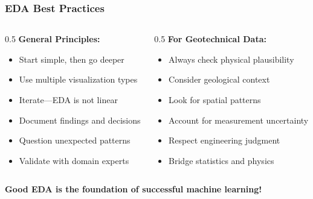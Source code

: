 \documentclass[aspectratio=169]{beamer}
\begin{document}
\begin{frame}
\frametitle{EDA Best Practices}

\begin{columns}[T]
    \begin{column}{0.5\textwidth}
        \textbf{General Principles:}
        \begin{itemize}
            \item Start simple, then go deeper
            \item Use multiple visualization types
            \item Iterate—EDA is not linear
            \item Document findings and decisions
            \item Question unexpected patterns
            \item Validate with domain experts
        \end{itemize}
    \end{column}
    \begin{column}{0.5\textwidth}
        \textbf{For Geotechnical Data:}
        \begin{itemize}
            \item Always check physical plausibility
            \item Consider geological context
            \item Look for spatial patterns
            \item Account for measurement uncertainty
            \item Respect engineering judgment
            \item Bridge statistics and physics
        \end{itemize}
    \end{column}
\end{columns}

\vspace{0.5cm}

\begin{center}
\Large
\textbf{Good EDA is the foundation of successful machine learning!}
\end{center}

\end{frame}
\end{document}
